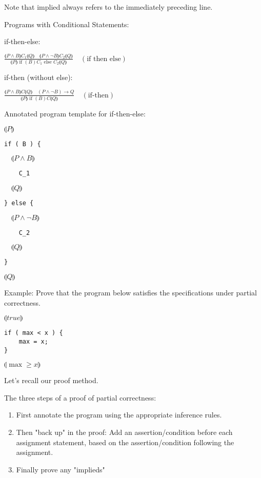 \documentclass{article}
\begin{document}
Note that implied always refers to the immediately preceding line.

Programs with Conditional Statements:

if-then-else:

$\frac{\llparenthesis P \wedge B \rrparenthesis C_1 \llparenthesis Q \rrparenthesis \quad \llparenthesis P \wedge \neg B \rrparenthesis C_2 \llparenthesis Q \rrparenthesis}{\llparenthesis P \rrparenthesis \text{ if } (B) C_1 \text{ else } C_2 \llparenthesis Q \rrparenthesis} \quad (\text{if then else})$

if-then (without else):

$\frac{\llparenthesis P \wedge B \rrparenthesis C \llparenthesis Q \rrparenthesis \quad (P \wedge \neg B) \to Q}{\llparenthesis P \rrparenthesis \text{ if } (B) C \llparenthesis Q \rrparenthesis} \quad (\text{if-then})$

Annotated program template for if-then-else:

$\llparenthesis P \rrparenthesis$
\begin{verbatim}
if ( B ) {
\end{verbatim}
$\quad \llparenthesis P \wedge B \rrparenthesis$
\begin{verbatim}
    C_1
\end{verbatim}
$\quad \llparenthesis Q \rrparenthesis$
\begin{verbatim}
} else {
\end{verbatim}
$\quad \llparenthesis P \wedge \neg B \rrparenthesis$
\begin{verbatim}
    C_2
\end{verbatim}
$\quad \llparenthesis Q \rrparenthesis$
\begin{verbatim}
}
\end{verbatim}
$\llparenthesis Q \rrparenthesis$

Example: Prove that the program below satisfies the specifications under partial correctness.

$\llparenthesis true \rrparenthesis$
\begin{verbatim}
if ( max < x ) {
    max = x;
}
\end{verbatim}
$\llparenthesis \max \ge x \rrparenthesis$

Let's recall our proof method.

The three steps of a proof of partial correctness:
\begin{enumerate}
    \item First annotate the program using the appropriate inference rules.
    \item Then "back up" in the proof: Add an assertion/condition before each assignment statement, based on the assertion/condition following the assignment.
    \item Finally prove any "implieds"
\end{enumerate}
\end{document}
